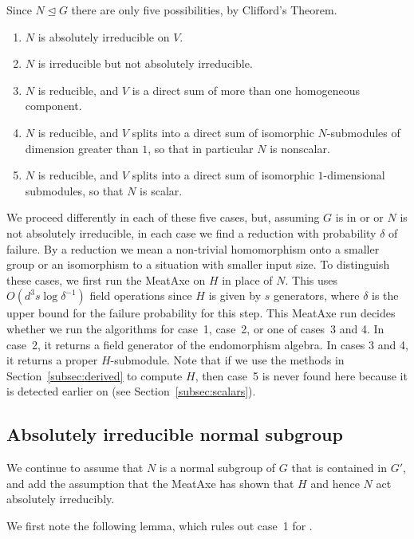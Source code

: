 Since $N \unlhd  G$ there are only five possibilities, 
by Clifford's Theorem. 
\begin{enumerate}
\setlength{\itemsep}{0pt}\setlength{\parskip}{0pt}
\item $N$ is absolutely irreducible on $V$.
\item $N$ is irreducible but not absolutely irreducible.
\item $N$ is reducible, and $V$ is a direct sum of 
more than one homogeneous component.
\item $N$ is reducible, and $V$ splits into a direct 
sum of isomorphic $N$-submodules of dimension greater than $1$, so that in particular $N$ is nonscalar.
\item $N$ is reducible, and $V$ splits into a direct sum of isomorphic $1$-dimensional submodules, so that $N$ is scalar.
\end{enumerate}

We proceed differently in each of these five cases, but, assuming $G$
is in  or  or $N$ is not absolutely irreducible, in each case
we find a reduction with probability $\delta$ of failure. 
By a reduction we mean a non-trivial homomorphism onto a
smaller group or an isomorphism to a situation with smaller input
size. To distinguish these cases, we first run the MeatAxe on $H$ 
in place of $N$.
This uses $O(d^3 s \log \delta^{-1})$ 
field operations since $H$ is given by $s$ generators, where
$\delta$ is the upper bound for the failure probability for this step.
This MeatAxe run decides whether we run the algorithms for
case~1, case~2, or one of
cases~3 and 4. In case~2, it returns a field generator of the endomorphism
algebra. In cases 3 and 4, it returns a proper $H$-submodule. Note
that if we use the methods in Section~\ref{subsec:derived} to compute
$H$, then case~5 is never found here because it is detected earlier on
 (see Section~\ref{subsec:scalars}).


\subsection{Absolutely irreducible normal subgroup}
\label{subsec:subfield_scalars}

We continue to assume that $N$ is a normal subgroup of $G$ that is
contained in $G'$, and add the assumption that the MeatAxe has shown that
$H$ and hence $N$ act absolutely irreducibly.

We first note the following lemma, which rules out case~1 for .

